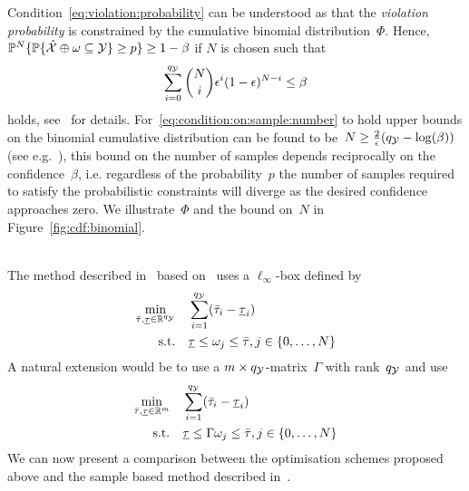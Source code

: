 %
Condition~\eqref{eq:violation:probability} can be understood as that the \emph{violation probability} is constrained by the cumulative binomial distribution~$\Phi$. 
%
Hence, $\mathbb P^N\{\mathbb P\{\hat{\mathcal X}\oplus\omega\subseteq\mathcal Y\}\geq p\}\geq1-\beta$ if $N$ is chosen such that
%
\begin{equation}\label{eq:condition:on:sample:number}
	\sum_{i=0}^{q_\mathcal Y}\binom{N}{i}\epsilon^{i}(1-\epsilon)^{N-i}\leq\beta
\end{equation} 
%
holds, see~\cite{Calafiore:2010} for details.
%
For~\eqref{eq:condition:on:sample:number} to hold upper bounds on the binomial cumulative distribution can be found to be~$N\geq\frac{2}{\epsilon}(q_\mathcal Y-\log(\beta))$ (see e.g.~\cite{Calafiore:2010}), this bound on the number of samples depends reciprocally on the confidence~$\beta$, i.e. regardless of the probability~$p$ the number of samples required to satisfy the probabilistic constraints will diverge as the desired confidence approaches zero.
%
We illustrate~$\Phi$ and the bound on~$N$ in Figure~\ref{fig:cdf:binomial}.
%

%
\\[1em]
%
The method described in~\cite{Zhang:2015} based on~\cite{Margellos:2014} uses a $\ell_\infty$-box defined by
%
\begin{equation}
	\begin{aligned}
	\min_{\bar\tau,\underline\tau\in\mathbb R^{q_\mathcal Y}}\quad& \sum_{i=1}^{q_\mathcal Y} (\bar\tau_i-\underline\tau_i)\\
	\text{s.t.}\quad& \underline\tau\leq \omega_j\leq \bar\tau, j\in\{0,\dots,N\}
	\end{aligned}
\end{equation}
%
A natural extension would be to use a $m\times q_\mathcal Y$-matrix~$\Gamma$ with rank~$q_\mathcal Y$ and use 
%
\begin{equation}
	\begin{aligned}
	\min_{\bar\tau,\underline\tau\in\mathbb R^{m}}\quad& \sum_{i=1}^{q_\mathcal Y} (\bar\tau_i-\underline\tau_i)\\
	\text{s.t.}\quad& \underline\tau\leq \Gamma\omega_j\leq \bar\tau, j\in\{0,\dots,N\}
	\end{aligned}
\end{equation}
%
We can now present a comparison between the optimisation schemes proposed above and the sample based method described in~\cite{Zhang:2015}.
%
